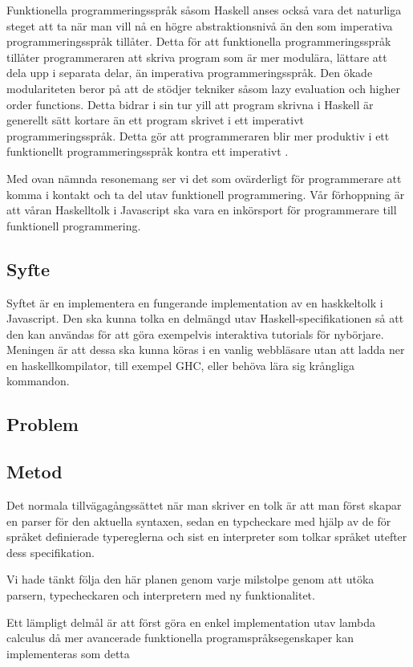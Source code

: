 Funktionella programmeringsspråk såsom Haskell anses också vara det naturliga steget att ta när man vill nå en högre abstraktionsnivå än den som imperativa programmeringsspråk tillåter.
Detta för att funktionella programmeringsspråk tillåter programmeraren att skriva program som är mer modulära, lättare att dela upp i separata delar, än imperativa programmeringsspråk. Den ökade modulariteten beror på att de stödjer tekniker såsom lazy evaluation och higher order functions.
Detta bidrar i sin tur yill att program skrivna i Haskell är generellt sätt kortare än ett program skrivet i ett imperativt programmeringsspråk. Detta gör att programmeraren blir mer produktiv i ett funktionellt programmeringsspråk kontra ett imperativt \citep{why}.

Med ovan nämnda resonemang ser vi det som ovärderligt för programmerare att komma i kontakt och ta del utav funktionell programmering. 
Vår förhoppning är att våran Haskelltolk i Javascript ska vara en inkörsport för programmerare till funktionell programmering.

\subsection{Syfte}
Syftet är en implementera en fungerande implementation av en haskkeltolk i Javascript. Den ska kunna tolka en delmängd utav Haskell-specifikationen så att den kan användas för att göra exempelvis interaktiva tutorials för nybörjare.
Meningen är att dessa ska kunna köras i en vanlig webbläsare utan att ladda ner en haskellkompilator, till exempel GHC, eller behöva lära sig krångliga kommandon.

\subsection{Problem} 

\subsection{Metod} 
Det normala tillvägagångssättet när man skriver en tolk är att man först
skapar en parser för den aktuella syntaxen, sedan en typcheckare med 
hjälp av de för språket definierade typereglerna och sist en interpreter
som tolkar språket utefter dess specifikation.

Vi hade tänkt följa den här planen genom varje milstolpe genom att utöka parsern, typecheckaren och interpretern med ny funktionalitet.

Ett lämpligt delmål är att först göra en enkel implementation utav lambda calculus då mer avancerade funktionella programspråksegenskaper kan implementeras som detta \citep{jones87}

